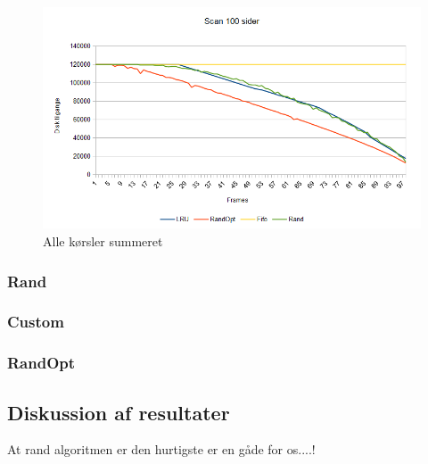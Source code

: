 \begin{figure}[ht]
\centerline{\includegraphics[scale=1]{graph/stat_scan}}
\FloatBarrier
\caption{Alle kørsler summeret}
\label{fig:scan}
\end{figure}

\subsubsection{Rand}

\subsubsection{Custom}

\subsubsection{RandOpt}

\subsection{Diskussion af resultater}
At rand algoritmen er den hurtigste er en gåde for os....!


